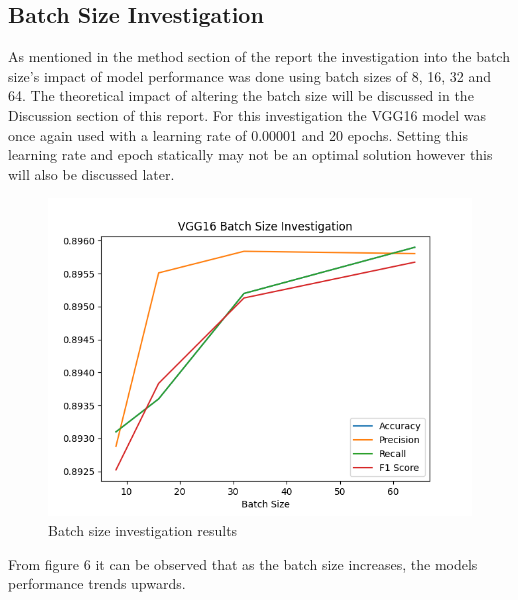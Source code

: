 \documentclass[10pt,twocolumn,letterpaper]{article}
\begin{document}
\subsection{Batch Size Investigation}
As mentioned in the method section of the report the investigation into the batch size's 
impact of model performance was done using batch sizes of 8, 16, 32 and 64. The 
theoretical impact of altering the batch size will be discussed in the Discussion section 
of this report. For this investigation the VGG16 model was once again used with a learning 
rate of 0.00001 and 20 epochs. Setting this learning rate and epoch statically may not 
be an optimal solution however this will also be discussed later.
\begin{center}
   \begin{figure}[H]
   \includegraphics[scale=0.6]{batch_size_investigation.png}
   \caption{Batch size investigation results}
   \end{figure}
   \end{center}
From figure 6 it can be observed that as the batch size increases, the models performance 
trends upwards.
\end{document}
